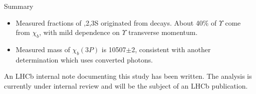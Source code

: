 \begin{frame}{Summary}

\begin{itemize}
\item Measured fractions of ,2,3S originated from \chib decays.
About 40\% of $\Upsilon$ come from $\chi_b$, with mild dependence on $\Upsilon$ transverse momentum.
\item Measured mass of $\chi_b(3P)$ is 10507$\pm$2\mevcc, consistent with another determination which uses converted photons.
\end{itemize}

\begin{block}{}
An LHCb internal note documenting this study has been written. The analysis is currently under 
internal review and will be the subject of an LHCb publication.
\end{block}

\end{frame}